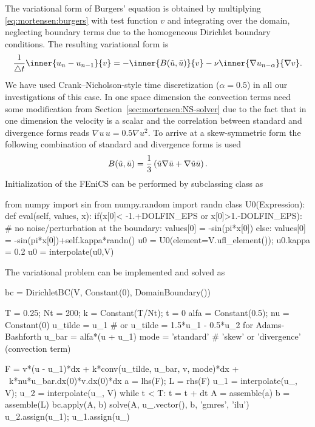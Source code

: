 The variational form of Burgers' equation is obtained by multiplying
\eqref{eq:mortensen:burgers} with test function $v$ and integrating over
the domain, neglecting boundary terms due to the homogeneous Dirichlet boundary
conditions. The resulting variational form is
\begin{equation}
 \frac{1}{\triangle t}\inner{ u_{n} - u_{n-1}}{v}
      = - \inner{B(\tilde{u},\Bar{u})}{ v }
          - \nu \inner{ \nabla u_{n-\alpha}}{\nabla v }.
\label{eq:mortensen:burgers_vf}
\end{equation}
We have used Crank--Nicholson-style time discretization ($\alpha=0.5$)
in all our investigations of this case. In one space
dimension the convection terms need some modification from
Section~\ref{sec:mortensen:NS-solver} due to the fact that in one dimension the
velocity is a scalar and the correlation between standard and divergence
forms reads $\nabla u \, u =0.5 \nabla u^2$. To arrive at a skew-symmetric
form the following combination of standard and divergence forms is used
\begin{equation}
 B(\tilde{u},\Bar{u})
    = \frac{1}{3}\left( \tilde{u}\nabla \Bar{u}
      + \nabla \tilde{u} \Bar{u} \right).
\end{equation}
Initialization of the FEniCS  can be performed by
subclassing class  as
\begin{python}
from numpy import sin
from numpy.random import randn
class U0(Expression):
    def eval(self, values, x):
        if(x[0]< -1.+DOLFIN_EPS or x[0]>1.-DOLFIN_EPS):
            # no noise/perturbation at the boundary:
            values[0] = -sin(pi*x[0])
        else:
            values[0] = -sin(pi*x[0])+self.kappa*randn()
u0 = U0(element=V.ufl_element()); u0.kappa = 0.2
u0 = interpolate(u0,V)
\end{python}
The variational problem can be implemented and solved as
\begin{python}
bc = DirichletBC(V, Constant(0), DomainBoundary())

T = 0.25; Nt = 200; k = Constant(T/Nt); t = 0
alfa = Constant(0.5); nu = Constant(0)
u_tilde = u_1 # or u_tilde = 1.5*u_1 - 0.5*u_2 for Adams-Bashforth
u_bar = alfa*(u + u_1)
mode = 'standard'  # 'skew' or 'divergence' (convection term)

F = v*(u - u_1)*dx + k*conv(u_tilde, u_bar, v, mode)*dx + \
    k*nu*u_bar.dx(0)*v.dx(0)*dx
a = lhs(F); L = rhs(F)
u_1 = interpolate(u_, V); u_2 = interpolate(u_, V)
while t < T:
    t = t + dt
    A = assemble(a)
    b = assemble(L)
    bc.apply(A, b)
    solve(A, u_.vector(), b, 'gmres', 'ilu')
    u_2.assign(u_1); u_1.assign(u_)
\end{python}

